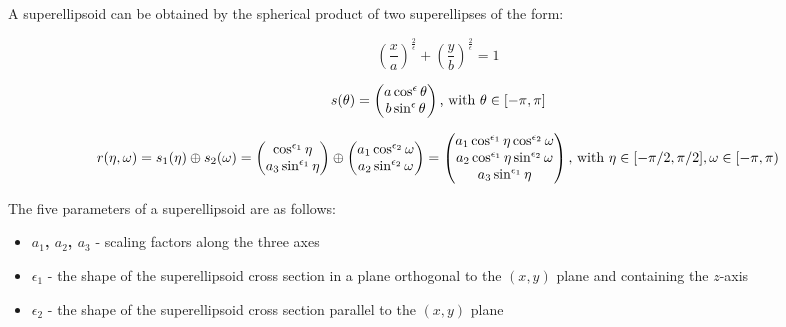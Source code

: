 \documentclass{article}
\begin{document}
A superellipsoid can be obtained by the spherical product of two superellipses of the form:

\begin{equation}
\left(\frac{x}{a}\right)^{\frac{2}{\epsilon}} + \left(\frac{y}{b}\right)^{\frac{2}{\epsilon}} = 1
\end{equation}

\begin{equation}
s(\theta) = \begin{pmatrix} a \cos^\epsilon{\theta} \\ b \sin^\epsilon {\theta} \end{pmatrix} \textnormal{, with } \theta \in [-\pi, \pi]
\end{equation}

\begin{equation}
r (\eta, \omega) = s_1 (\eta) \oplus s_2 (\omega) = \begin{pmatrix} \cos^{\epsilon_1} {\eta} \\ a_3 \sin^{\epsilon_1} {\eta} \end{pmatrix} \oplus \begin{pmatrix} a_1 \cos^{\epsilon_2} {\omega} \\ a_2 \sin^{\epsilon_2} {\omega} \end{pmatrix} = \begin{pmatrix} a_1 \cos^{\epsilon_1} {\eta} \cos^{\epsilon_2} {\omega} \\ a_2 \cos^{\epsilon_1} {\eta} \sin^{\epsilon_2} {\omega} \\ a_3 \sin^{\epsilon_1}{\eta}\end{pmatrix} \textnormal{, with } \eta \in [-\pi/2, \pi/2], \omega \in [-\pi, \pi)
\end{equation}

The five parameters of a superellipsoid are as follows:

\begin{itemize}
	\item {\textbf{$a_1$, $a_2$, $a_3$} - scaling factors along the three axes}
	\item {\textbf{$\epsilon_1$} - the shape of the superellipsoid cross section in a plane orthogonal to the $(x, y)$ plane and containing the $z$-axis}
	\item {\textbf{$\epsilon_2$} - the shape of the superellipsoid cross section parallel to the $(x, y)$ plane}	
\end{itemize}

\end{document}
